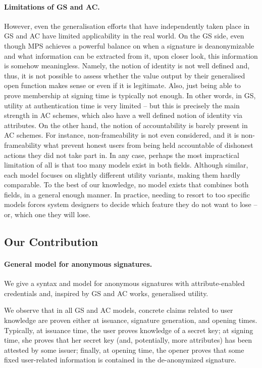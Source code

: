 \paragraph{Limitations of GS and AC.} %
However, even the generalisation efforts that have independently taken place in
GS and AC have limited applicability in the real world. On the GS side, even
though MPS achieves a powerful balance on when a signature is
deanonymizable and what information can be extracted from it, upon closer look,
this information is somehow meaningless. Namely, the notion of identity is not
well defined and, thus, it is not possible to assess whether the value output by
their generalised open function makes sense or even if it is legitimate. Also,
just being able to prove membership at signing time is typically not enough. In
other words, in GS, utility at authentication time is very limited -- but this
is precisely the main strength in AC schemes, which also have a well defined
notion of identity via attributes. On the other hand, the notion of
accountability  is barely present in AC schemes. For instance, non-frameability
is not even considered, and it is non-frameability what prevent honest users
from being held accountable of dishonest actions they did not take part in.
%
In any case, perhaps the most impractical limitation of all is that too many
models exist in both fields. Although similar, each model focuses on slightly
different utility variants, making them hardly comparable. To the best of our
knowledge, no model exists that combines both fields, in a general enough
manner. In practice, needing to resort to too specific models forces system
designers to decide which feature they do not want to lose -- or, which one they
will lose.

\subsection{Our Contribution} 

\paragraph{General model for anonymous signatures.} %
We give a syntax and model for anonymous signatures with attribute-enabled
credentials and, inspired by GS and AC works, generalised utility.

We observe that in all GS and AC models, concrete
claims related to user knowledge are proven either at issuance, signature
generation, and opening times. Typically, at issuance time, the user proves
knowledge of a secret key; at signing time, she proves that her secret key (and,
potentially, more attributes) has been attested by some issuer; finally, at
opening time, the opener proves that some fixed user-related information is
contained in the de-anonymized signature.

